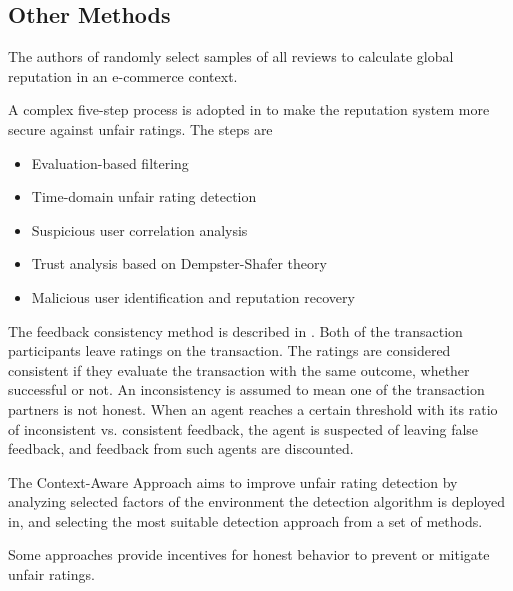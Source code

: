 \documentclass[%
    ]{\PathToTumTemplate/thesis/tum_thesis}
\begin{document}
\subsection{Other Methods}

The authors of \cite{rezvani_randomized_2020} randomly select samples of all reviews to calculate global reputation in an e-commerce context.

A complex five-step process is adopted in \cite{baby_secure_2014} to make the reputation system more secure against unfair ratings.
The steps are
\begin{itemize}
\item Evaluation-based filtering
\item Time-domain unfair rating detection
\item Suspicious user correlation analysis
\item Trust analysis based on Dempster-Shafer theory
\item Malicious user identification and reputation recovery
\end{itemize}


The feedback consistency method is described in \cite{azzedin_identifying_2010}.
Both of the transaction participants leave ratings on the transaction.
The ratings are considered consistent if they evaluate the transaction with the same outcome, whether successful or not.
An inconsistency is assumed to mean one of the transaction partners is not honest.
When an agent reaches a certain threshold with its ratio of inconsistent vs. consistent feedback, the agent is suspected of leaving false feedback, and feedback from such agents are discounted.

The Context-Aware Approach aims to improve unfair rating detection by analyzing selected factors of the environment the detection algorithm is deployed in, and selecting the most suitable detection approach from a set of methods\cite{wan_context-aware_2012}.

Some approaches provide incentives for honest behavior to prevent or mitigate unfair ratings\cite{thakur_reputation_2019, jurca_minimum_2006}.
\end{document}
